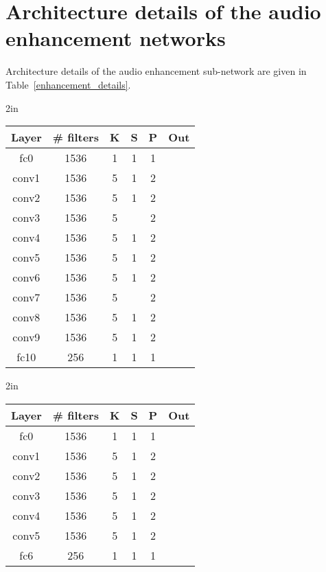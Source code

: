 \documentclass[10pt,twocolumn,letterpaper]{article}
\begin{document}
\section{Architecture details of the audio enhancement networks}\label{architecture_AE}
Architecture details of the audio enhancement sub-network are given in Table~\ref{enhancement_details}.   
\begin{table*}[t]
\begin{center}
    \begin{subtable}{2in}
        \centering
        \begin{tabular}{cccccc}
        \toprule
        {\bf Layer} & {\bf \# filters} & {\bf K} & {\bf S} & {\bf P} & {\bf Out}\\
        \midrule
fc0 & 1536 & 1 & 1 & 1 & \\
        conv1 & 1536 & 5 & 1 & 2 & \\
        conv2 & 1536 & 5 & 1 & 2 & \\
        conv3 & 1536 & 5 &  & 2 & \\
        conv4 & 1536 & 5 & 1 & 2 & \\
        conv5 & 1536 & 5 & 1 & 2 & \\
        conv6 & 1536 & 5 & 1 & 2 & \\
        conv7 & 1536 & 5 &  & 2 & \\
        conv8 & 1536 & 5 & 1 & 2 & \\
        conv9 & 1536 & 5 & 1 & 2 & \\
        fc10 & 256 & 1 & 1 & 1 & \\
        \bottomrule
        \end{tabular}
        \caption{Video Stream of 1D ResNet.}
    \end{subtable}
    \qquad\qquad
\begin{subtable}{2in}
        \centering
        \begin{tabular}{cccccc}
        \toprule
        {\bf Layer} & {\bf \# filters} & {\bf K} & {\bf S} & {\bf P} & {\bf Out}\\
        \midrule
fc0 & 1536 & 1 & 1 & 1 & \\
        conv1 & 1536 & 5 & 1 & 2 & \\
        conv2 & 1536 & 5 & 1 & 2 & \\
        conv3 & 1536 & 5 & 1 & 2 & \\
        conv4 & 1536 & 5 & 1 & 2 & \\
        conv5 & 1536 & 5 & 1 & 2 & \\
        fc6 & 256 & 1 & 1 & 1 & \\
    \bottomrule
    \end{tabular}
    \caption{Audio Stream of 1D ResNet.}
    \end{subtable}
    \\
  

\end{center}
\end{table*}
\end{document}
